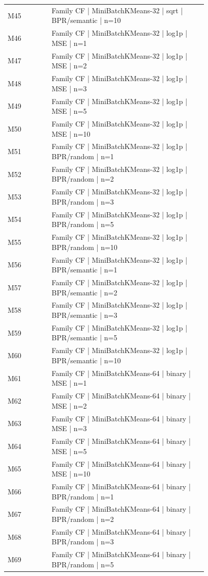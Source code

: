 \begin{longtable}{lp{0.78\linewidth}}
M45 & Family CF | MiniBatchKMeans-32 | sqrt | BPR/semantic | n=10 \\
M46 & Family CF | MiniBatchKMeans-32 | log1p | MSE | n=1 \\
M47 & Family CF | MiniBatchKMeans-32 | log1p | MSE | n=2 \\
M48 & Family CF | MiniBatchKMeans-32 | log1p | MSE | n=3 \\
M49 & Family CF | MiniBatchKMeans-32 | log1p | MSE | n=5 \\
M50 & Family CF | MiniBatchKMeans-32 | log1p | MSE | n=10 \\
M51 & Family CF | MiniBatchKMeans-32 | log1p | BPR/random | n=1 \\
M52 & Family CF | MiniBatchKMeans-32 | log1p | BPR/random | n=2 \\
M53 & Family CF | MiniBatchKMeans-32 | log1p | BPR/random | n=3 \\
M54 & Family CF | MiniBatchKMeans-32 | log1p | BPR/random | n=5 \\
M55 & Family CF | MiniBatchKMeans-32 | log1p | BPR/random | n=10 \\
M56 & Family CF | MiniBatchKMeans-32 | log1p | BPR/semantic | n=1 \\
M57 & Family CF | MiniBatchKMeans-32 | log1p | BPR/semantic | n=2 \\
M58 & Family CF | MiniBatchKMeans-32 | log1p | BPR/semantic | n=3 \\
M59 & Family CF | MiniBatchKMeans-32 | log1p | BPR/semantic | n=5 \\
M60 & Family CF | MiniBatchKMeans-32 | log1p | BPR/semantic | n=10 \\
M61 & Family CF | MiniBatchKMeans-64 | binary | MSE | n=1 \\
M62 & Family CF | MiniBatchKMeans-64 | binary | MSE | n=2 \\
M63 & Family CF | MiniBatchKMeans-64 | binary | MSE | n=3 \\
M64 & Family CF | MiniBatchKMeans-64 | binary | MSE | n=5 \\
M65 & Family CF | MiniBatchKMeans-64 | binary | MSE | n=10 \\
M66 & Family CF | MiniBatchKMeans-64 | binary | BPR/random | n=1 \\
M67 & Family CF | MiniBatchKMeans-64 | binary | BPR/random | n=2 \\
M68 & Family CF | MiniBatchKMeans-64 | binary | BPR/random | n=3 \\
M69 & Family CF | MiniBatchKMeans-64 | binary | BPR/random | n=5 \\

\end{longtable}
